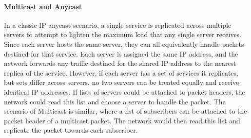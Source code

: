 \paragraph{Multicast and Anycast} In a classic IP anycast scenario, a single
service is replicated across multiple servers to attempt to lighten the maximum
load that any single server receives. Since each server hosts the same server,
they can all equivalently handle packets destined for that service. Each server
is assigned the same IP address, and the network forwards any traffic destined
for the shared IP address to the nearest replica of the service. However, if
each server has a set of services it replicates, but sets differ across
servers, no two servers can be treated equally and receive identical IP
addresses. If lists of servers could be attached to packet headers, the
network could read this list and choose a server to handle the packet. The
scenario of Multicast is similar, where a list of subscribers can be
attached to the packet header of a multicast packet. The network would then
read this list and replicate the packet towards each subscriber. 
